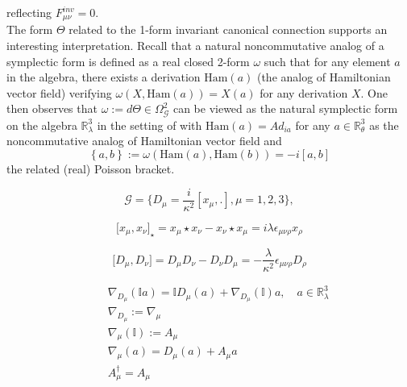 \documentclass[10pt]{book}
\theoremstyle{break}
\begin{document}
%
reflecting $F^{inv}_{\mu\nu}=0$. \\ 
The form $\Theta$ related to the 1-form invariant canonical connection supports an interesting interpretation. Recall %
that a natural noncommutative analog of a symplectic form is defined as a real closed 2-form $\omega$ such that for any element $a$ in the algebra, there exists a derivation $\text{Ham}(a)$ (the analog of Hamiltonian vector field) verifying $\omega(X,\text{Ham}(a))=X(a)$ for any derivation $X$. One then observes that $\omega:=d\Theta\in\Omega^2_\mathcal{G}$ can be viewed as the natural symplectic form on the algebra $\mathbb{R}^3_\lambda$ in the setting of %
with $\text{Ham}(a)=Ad_{ia}$ for any $a\in\mathbb{R}^3_\theta$ as the noncommutative analog of Hamiltonian vector field and 
\begin{equation*}
\left\{a,b\right\}:=\omega\left(\text{Ham}(a),\text{Ham}(b)\right)=-i\left[a,b\right]%
\end{equation*}
the related (real) Poisson bracket.\par




\begin{equation*}
 \mathcal{G} = \big\{ D_\mu = \frac{i}{\kappa^2} [ x_\mu , . ] , \mu=1,2,3 \big\},
\end{equation*}

\begin{equation*}
 \big[ x_\mu , x_\nu \big]_{\star} = x_\mu \star x_\nu - x_\nu \star x_\mu = i \lambda \epsilon_{\mu \nu \rho} x_\rho  
\end{equation*}


\begin{equation*}
 \big[ D_\mu , D_\nu \big] = D_\mu D_\nu - D_\nu D_\mu = - \frac{\lambda}{\kappa^2} \epsilon_{\mu \nu \rho} D_\rho  
\end{equation*}

\begin{eqnarray*}
 && \nabla_{D_\mu} (\mathbb{I} a) = \mathbb{I} D_\mu (a) + \nabla_{D_\mu} (\mathbb{I}) a , \quad a \in \mathbb{R}^{3}_{\lambda} \\
 && \nabla_{D_\mu} := \nabla_{\mu} \nonumber \\
 && \nabla_\mu (\mathbb{I}) := A_{\mu} \nonumber \\
 && \nabla_{\mu} (a) = D_\mu (a) + A_\mu a \\
 && A_\mu^{\dagger} = A_{\mu}
\end{eqnarray*} 
\end{document}
